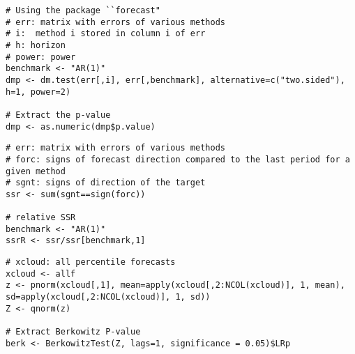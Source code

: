 \documentclass[12pt]{article}
\begin{document}
\begin{lstlisting}[title=\textbf{Two Sided Diebold-Mariano.}]
# Using the package ``forecast"
# err: matrix with errors of various methods
# i:  method i stored in column i of err
# h: horizon
# power: power
benchmark <- "AR(1)"
dmp <- dm.test(err[,i], err[,benchmark], alternative=c("two.sided"), h=1, power=2)

# Extract the p-value
dmp <- as.numeric(dmp$p.value)
\end{lstlisting}

\begin{lstlisting}[title=\textbf{Sign Success Ratio.}]
# err: matrix with errors of various methods
# forc: signs of forecast direction compared to the last period for a given method
# sgnt: signs of direction of the target
ssr <- sum(sgnt==sign(forc))

# relative SSR
benchmark <- "AR(1)"
ssrR <- ssr/ssr[benchmark,1]
\end{lstlisting}

\begin{lstlisting}[title=\textbf{Berkowitz LR Test.}]
# xcloud: all percentile forecasts
xcloud <- allf
z <- pnorm(xcloud[,1], mean=apply(xcloud[,2:NCOL(xcloud)], 1, mean), sd=apply(xcloud[,2:NCOL(xcloud)], 1, sd))
Z <- qnorm(z)

# Extract Berkowitz P-value
berk <- BerkowitzTest(Z, lags=1, significance = 0.05)$LRp
\end{lstlisting}
\end{document}
